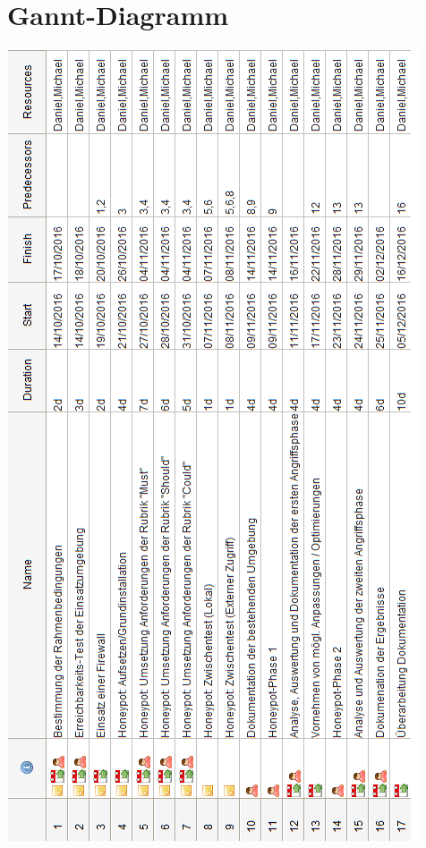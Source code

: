 \chapter{Gannt-Diagramm}
\label{sec:Gannt-Diagramm}

\begin{center}
\includegraphics[scale=0.78]{img/gannt_tasks.png}
\end{center}

\newpage

